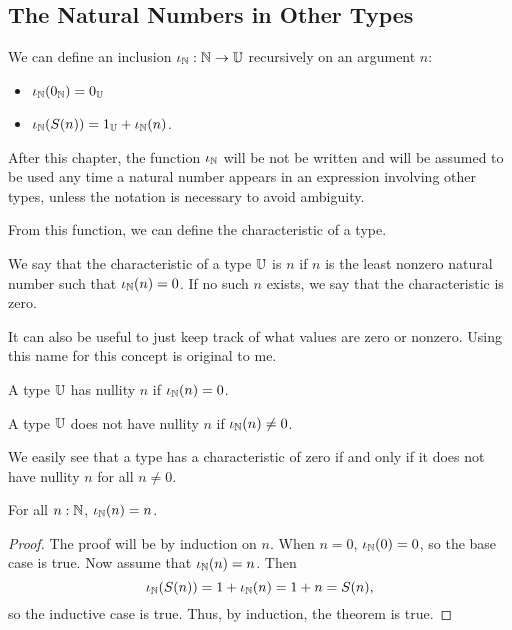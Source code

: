 \documentclass[../math.tex]{subfiles}
\begin{document}
\subsection{The Natural Numbers in Other Types}

\begin{definition}
    We can define an inclusion $\iota_{\mathbb{N}} : \mathbb{N} \rightarrow \mathbb{U}$ recursively on an
    argument $n$:
    \begin{itemize}
        \item $\iota_{\mathbb{N}}(0_{\mathbb{N}}) = 0_{\mathbb{U}}$
        \item $\iota_{\mathbb{N}}(S(n)) = 1_{\mathbb{U}} + \iota_{\mathbb{N}}(n)$.
    \end{itemize}
    After this chapter, the function $\iota_{\mathbb{N}}$ will be not be written and will
    be assumed to be used any time a natural number appears in an expression
    involving other types, unless the notation is necessary to avoid ambiguity.
\end{definition}

From this function, we can define the characteristic of a type.

\begin{class}
    We say that the characteristic of a type $\mathbb{U}$ is $n$ if $n$ is the least
    nonzero natural number such that $\iota_{\mathbb{N}}(n) = 0$.  If no such $n$ exists,
    we say that the characteristic is zero.
\end{class}

It can also be useful to just keep track of what values are zero or nonzero.
Using this name for this concept is original to me.

\begin{class}
    A type $\mathbb{U}$ has nullity $n$ if $\iota_{\mathbb{N}}(n) = 0$.
\end{class}
\begin{class}
    A type $\mathbb{U}$ does not have nullity $n$ if $\iota_{\mathbb{N}}(n) \neq 0$.
\end{class}

We easily see that a type has a characteristic of zero if and only if it does
not have nullity $n$ for all $n \neq 0$.

\begin{theorem}
    For all $n : \mathbb{N}$, $\iota_{\mathbb{N}}(n) = n$.
\end{theorem}
\begin{proof}
    The proof will be by induction on $n$.  When $n = 0$, $\iota_{\mathbb{N}}(0) = 0$, so
    the base case is true.  Now assume that $\iota_{\mathbb{N}}(n) = n$.  Then
    \[
        \iota_{\mathbb{N}}(S(n)) = 1 + \iota_{\mathbb{N}}(n) = 1 + n = S(n),
    \]
    so the inductive case is true.  Thus, by induction, the theorem is true.
\end{proof}
\end{document}
